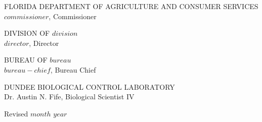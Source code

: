 \documentclass{sop_class}[overrideChapters] %
\begin{document}

\docBodyfalse

\begin{center}
    \thispagestyle{empty}%
      \vspace*{-0.4in}%
          \vfill%
            FLORIDA DEPARTMENT OF AGRICULTURE AND CONSUMER SERVICES\\
            {$commissioner$}, Commissioner\\
            \bigbreak%
            
            DIVISION OF \MakeUppercase{$division$}\\
            {$director$}, Director\\
            \bigbreak%
            
            BUREAU OF \MakeUppercase{$bureau$}\\
            {$bureau-chief$}, Bureau Chief\\
            \bigbreak%
             
            
            \vspace*{4in}%
            
            DUNDEE BIOLOGICAL CONTROL LABORATORY\\
            Dr. Austin N. Fife, Biological Scientist IV\\
            \bigbreak%
            
            Revised {$month$ $year$}\\ 
          \vfill%
\end{center}

\newpage


\realSingleSpace
  \tableofcontents %


% 

\listoffigures
\end{document}
